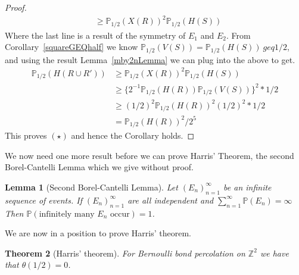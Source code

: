 \documentclass[a4paper,11pt]{article}
\newtheorem{theorem}{Theorem}[section]
\newtheorem{lemma}[theorem]{Lemma}
\theoremstyle{definition}
\newcommand{\ints}{\mathbb{Z}}
\newcommand{\prbhlf}{\mathbb{P}_{1/2}}
\begin{document}
\begin{proof}
\begin{align*}
	& \geq \prbhlf(X(R))^2\prbhlf(H(S))
	\end{align*}
	Where the last line is a result of the symmetry of $E_1$ and $E_2$. From Corollary~\ref{squareGEQhalf} we know $\prbhlf(V(S)) =\prbhlf(H(S)) \ geq 1/2$, and using the result Lemma~\ref{mby2nLemma} we can plug into the above to get.
	\begin{align*}
		\prbhlf(H(R \cup R')) & \geq \prbhlf(X(R))^2\prbhlf(H(S)) \\
		& \geq \{2^{-1} \prbhlf (H(R)) \prbhlf (V(S))\}^2*1/2 \\
		& \geq (1/2)^2 \prbhlf(H(R))^2(1/2)^2*1/2 \\
		& = \prbhlf(H(R))^2/2^5
	\end{align*}
	This proves $(\star)$ and hence the Corollary holds. 
\end{proof}

We now need one more result before we can prove Harris' Theorem, the second Borel-Cantelli Lemma which we give without proof. 
\begin{lemma}[Second Borel-Cantelli Lemma]
	Let $(E_n)_{n=1}^\infty$ be an infinite sequence of events. If $(E_n)_{n=1}^\infty$ are all independent and $\sum_{n=1}^{\infty} \mathbb{P}(E_n) = \infty$ Then $\mathbb{P}(\text{infinitely many }E_n\text{ occur}) = 1$.
\end{lemma}

We are now in a position to prove Harris' theorem.

\begin{theorem}[Harris' theorem]
	For Bernoulli bond percolation on $\ints^2$ we have that $\theta(1/2) = 0$.
\end{theorem}
\end{document}
